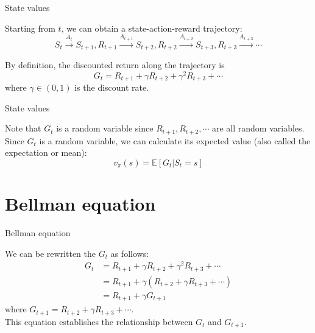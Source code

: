 \documentclass[aspectratio=169,xcolor=dvipsnames]{beamer}
\begin{document}
\begin{frame}{State values}

Starting from $t$, we can obtain a state-action-reward trajectory:
\begin{equation*}
	S_t \xrightarrow{A_t} S_{t + 1}, R_{t + 1} \xrightarrow{A_{t + 1}} S_{t + 2}, R_{t + 2} \xrightarrow{A_{t + 2}} S_{t + 3}, R_{t + 3}  \xrightarrow{A_{t + 3}} \cdots
\end{equation*}

By definition, the discounted return along the trajectory is 
\begin{equation*}
	G_t = R_{t + 1} + \gamma R_{t + 2} + \gamma^2 R_{t + 3} + \cdots
\end{equation*}
where $\gamma \in (0, 1)$ is the discount rate.

\end{frame}


\begin{frame}{State values}

Note that $G_t$ is a random variable since $R_{t + 1}, R_{t + 2}, \cdots$ are all random variables. \\
Since $G_t$ is a random variable, we can calculate its expected value (also called the expectation or mean):
\begin{equation*}
	v_\pi(s) = \mathbb{E}[G_t | S_t = s]
\end{equation*}

\end{frame}

\section{Bellman equation}

\begin{frame}{Bellman equation}

We can be rewritten the $G_t$ as follows:
\begin{equation*}
	\begin{aligned}
		G_t
		&= R_{t + 1} + \gamma R_{t + 2} + \gamma^2 R_{t + 3} + \cdots \\
		&= R_{t + 1} + \gamma (R_{t + 2} + \gamma R_{t + 3} + \cdots) \\
		&= R_{t + 1} + \gamma G_{t + 1}
	\end{aligned}
\end{equation*}
where $G_{t + 1} = R_{t + 2} + \gamma R_{t + 3} + \cdots$. \\
This equation establishes the relationship between $G_t$ and $G_{t + 1}$.

\end{frame}
\end{document}
